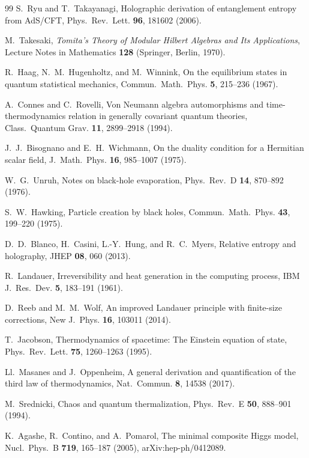 \documentclass[aps,pra,onecolumn,superscriptaddress,nofootinbib,10pt]{revtex4-2}
\theoremstyle{definition}
\theoremstyle{remark}
\begin{document}
\begin{thebibliography}{99}
 S.~Ryu and T.~Takayanagi, Holographic derivation of entanglement entropy from AdS/CFT, Phys.\ Rev.\ Lett. \textbf{96}, 181602 (2006).

 M.~Takesaki, \emph{Tomita's Theory of Modular Hilbert Algebras and Its Applications}, Lecture Notes in Mathematics \textbf{128} (Springer, Berlin, 1970).

 R.~Haag, N.~M.~Hugenholtz, and M.~Winnink, On the equilibrium states in quantum statistical mechanics, Commun.\ Math.\ Phys. \textbf{5}, 215--236 (1967).

 A.~Connes and C.~Rovelli, Von Neumann algebra automorphisms and time-thermodynamics relation in generally covariant quantum theories, Class.\ Quantum Grav. \textbf{11}, 2899--2918 (1994).

 J.~J.~Bisognano and E.~H.~Wichmann, On the duality condition for a Hermitian scalar field, J.\ Math.\ Phys. \textbf{16}, 985--1007 (1975).

 W.~G.~Unruh, Notes on black-hole evaporation, Phys.\ Rev.\ D \textbf{14}, 870--892 (1976).

 S.~W.~Hawking, Particle creation by black holes, Commun.\ Math.\ Phys. \textbf{43}, 199--220 (1975).

 D.~D.~Blanco, H.~Casini, L.-Y.~Hung, and R.~C.~Myers, Relative entropy and holography, JHEP \textbf{08}, 060 (2013).

 R.~Landauer, Irreversibility and heat generation in the computing process, IBM J.\ Res.\ Dev. \textbf{5}, 183--191 (1961).

 D.~Reeb and M.~M.~Wolf, An improved Landauer principle with finite-size corrections, New J.\ Phys. \textbf{16}, 103011 (2014).

 T.~Jacobson, Thermodynamics of spacetime: The Einstein equation of state, Phys.\ Rev.\ Lett. \textbf{75}, 1260--1263 (1995).

 Ll.~Masanes and J.~Oppenheim, A general derivation and quantification of the third law of thermodynamics, Nat.\ Commun. \textbf{8}, 14538 (2017).

 M.~Srednicki, Chaos and quantum thermalization, Phys.\ Rev.\ E \textbf{50}, 888--901 (1994).

 K.~Agashe, R.~Contino, and A.~Pomarol, The minimal composite Higgs model, Nucl.\ Phys.\ B \textbf{719}, 165--187 (2005), arXiv:hep-ph/0412089.


\end{thebibliography}
\end{document}
